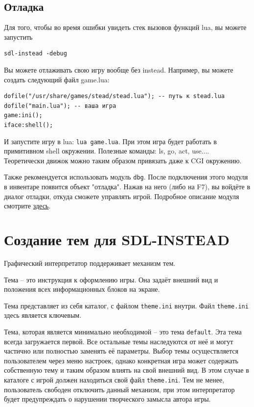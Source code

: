 \documentclass[a4paper,12pt]{article}
\begin{document}
\subsection{Отладка}
Для того, чтобы во время ошибки увидеть стек вызовов функций lua, вы можете запустить

\begin{verbatim}
sdl-instead -debug
\end{verbatim}

Вы можете отлаживать свою игру вообще без instead. Например, вы можете создать следующий файл game.lua:

\begin{verbatim}
dofile("/usr/share/games/stead/stead.lua"); -- путь к stead.lua
dofile("main.lua"); -- ваша игра
game:ini();
iface:shell();
\end{verbatim}

И запустите игру в lua: \verb/lua game.lua/. При этом игра будет работать в примитивном shell окружении. Полезные команды: ls, go, act, use.... Теоретически движок можно таким образом привязать даже к CGI окружению.

Также рекомендуется использовать модуль \verb/dbg/. После подключения этого модуля в инвентаре появится объект "отладка". Нажав на него (либо на F7), вы войдёте в диалог отладки, откуда сможете управлять игрой. Подробное описание модуля смотрите \href{http://instead.pinebrush.com/wiki/ru/gamedev/modules/dbg}{здесь}.

\section{Создание тем для SDL-INSTEAD}

Графический интерпретатор поддерживает механизм тем.

Тема -- это инструкция к оформлению игры. Она задаёт внешний вид и положения всех информационных блоков на экране.

Тема представляет из себя каталог, с файлом \verb/theme.ini/ внутри. Файл \verb/theme.ini/ здесь является ключевым.

Тема, которая является минимально необходимой -- это тема \verb/default/. Эта тема всегда загружается первой. Все остальные темы наследуются от неё и могут частично или полностью заменять её параметры. Выбор темы осуществляется пользователем через меню настроек, однако конкретная игра может содержать собственную тему и таким образом влиять на свой внешний вид. В этом случае в каталоге с игрой должен находиться свой файл \verb/theme.ini/. Тем не менее, пользователь свободен отключить данный механизм, при этом интерпретатор будет предупреждать о нарушении творческого замысла автора игры.
\end{document}
